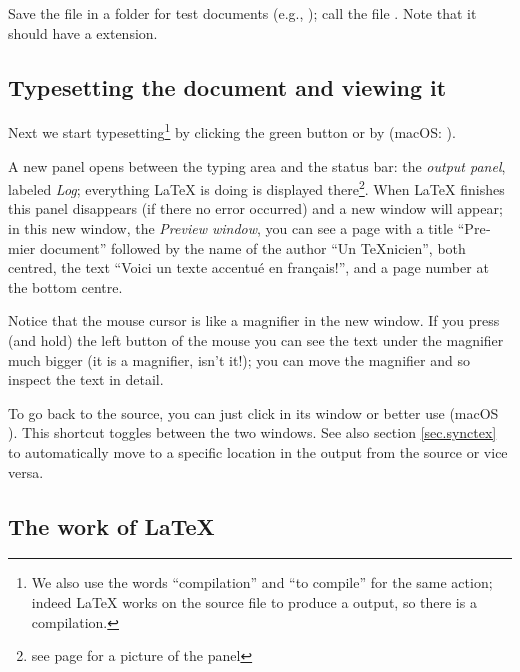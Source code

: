 Save the file in a folder for test documents (e.g., ); call the file . Note that it should have a  extension.

\subsection{Typesetting the document and viewing it}

Next we start typesetting\footnote{We also use the words ``compilation'' and ``to compile'' for the same action; indeed {\LaTeX} works on the source file to produce a  output, so there is a compilation.} by clicking the green button 
or by  (macOS: ).

A new panel opens between the typing area and the status bar: the \emph{output panel}, labeled \emph{Log}; everything {\LaTeX} is doing is displayed there\footnote{see page \pageref{fig:consoleOutput} for a picture of the panel}. When {\LaTeX} finishes this panel disappears (if there no error occurred) and a new window will appear; in this new window, the \emph{Preview window}, you can see a page with a title \foreignlanguage{french}{``Premier document''} followed by the name of the author \foreignlanguage{french}{``Un TeXnicien''}, both centred, the text
\foreignlanguage{french}{``Voici un texte accentué en français!''}, and a page number at the bottom centre.

Notice that the mouse cursor is like a magnifier in the new window. If you press (and hold) the left button of the mouse you can see the text under the magnifier much bigger (it is a magnifier, isn't it!); you can move the magnifier and so inspect the text in detail.

To go back to the source, you can just click in its window or better use  (macOS ). This shortcut toggles between the two windows. See also section \ref{sec.synctex} to automatically move to a specific location in the output from the source or vice versa.

\subsection{The work of \LaTeX}

